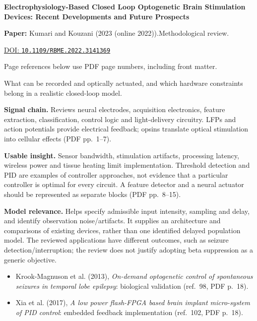 

{\Large\bfseries Electrophysiology-Based Closed Loop Optogenetic Brain Stimulation Devices: Recent Developments and Future Prospects\par}

\textbf{Paper:} Kumari and Kouzani (2023 (online 2022)).\quad Methodological review.\par
\href{https://doi.org/10.1109/RBME.2022.3141369}{DOI: \nolinkurl{10.1109/RBME.2022.3141369}}\par
{\footnotesize Page references below use PDF page numbers, including front matter.}

What can be recorded and optically actuated, and which hardware constraints belong in a realistic closed-loop model.

\textbf{Signal chain.} Reviews neural electrodes, acquisition electronics, feature extraction, classification, control logic and light-delivery circuitry. LFPs and action potentials provide electrical feedback; opsins translate optical stimulation into cellular effects (PDF pp.~1--7).

\textbf{Usable insight.} Sensor bandwidth, stimulation artifacts, processing latency, wireless power and tissue heating limit implementation. Threshold detection and PID are examples of controller approaches, not evidence that a particular controller is optimal for every circuit. A feature detector and a neural actuator should be represented as separate blocks (PDF pp.~8--15).

\textbf{Model relevance.} Helps specify admissible input intensity, sampling and delay, and identify observation noise/artifacts. It supplies an architecture and comparisons of existing devices, rather than one identified delayed population model. The reviewed applications have different outcomes, such as seizure detection/interruption; the review does not justify adopting beta suppression as a generic objective.

\begin{itemize}
\item Krook-Magnuson et al. (2013), \emph{On-demand optogenetic control of spontaneous seizures in temporal lobe epilepsy}: biological validation (ref.~98, PDF p.~18).
\item Xia et al. (2017), \emph{A low power flash-FPGA based brain implant micro-system of PID control}: embedded feedback implementation (ref.~102, PDF p.~18).
\end{itemize}


